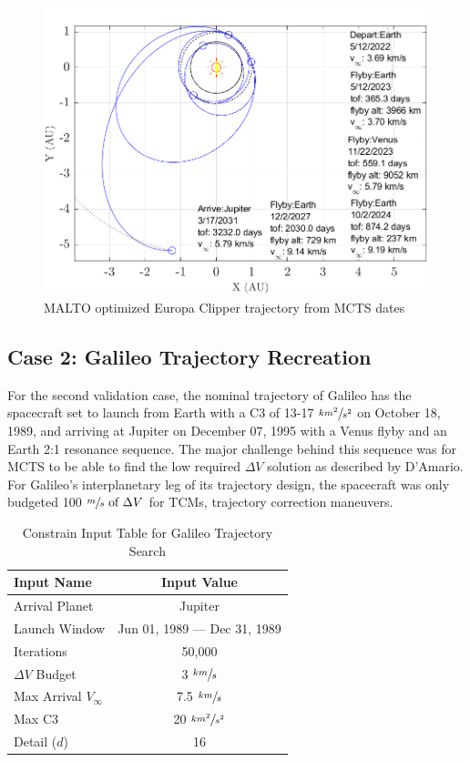 \documentclass[letterpaper, preprint, paper,11pt]{AAS}	%
\begin{document}
\begin{figure}[t!]
    \centering
    \includegraphics[width = 5in]{./fig/clipperMalto.png}
    \caption{MALTO optimized Europa Clipper trajectory from MCTS dates}
    \label{fig:clipMalto}
\end{figure}


\subsection{Case 2: Galileo Trajectory Recreation}

For the second validation case, the nominal trajectory of Galileo has the spacecraft set to launch from Earth with a C3 of 13-17 $\sfrac{km^2}{s^2}$ on October 18, 1989, and arriving at Jupiter on December 07, 1995 with a Venus flyby and an Earth 2:1 resonance sequence. The major challenge behind this sequence was for MCTS to be able to find the low required $\Delta V$ solution as described by D'Amario\cite{DAmario1992}. For Galileo's interplanetary leg of its trajectory design, the spacecraft was only budgeted 100 $\sfrac{m}{s} \text{ of } \Delta V$ for TCMs, trajectory correction maneuvers. 

\begin{table}[htb]
    \centering
    \caption{Constrain Input Table for Galileo Trajectory Search}
    \label{table:galiInputs}
    \begin{tabular}{lc}
        \toprule
        \textbf{Input Name} & \textbf{Input Value}\\
        \midrule
        Arrival Planet & Jupiter \\
        Launch Window & Jun 01, 1989 --- Dec 31, 1989 \\
        Iterations & 50,000 \\ 
        $\Delta V$ Budget & 3 $\sfrac{km}{s}$ \\
        Max Arrival $V_{\infty}$ & 7.5 $\sfrac{km}{s}$  \\
        Max C3 & 20 $\sfrac{km^2}{s^2}$ \\
        Detail ($d$) & 16 \\
        \bottomrule
    \end{tabular}
\end{table}
\end{document}
